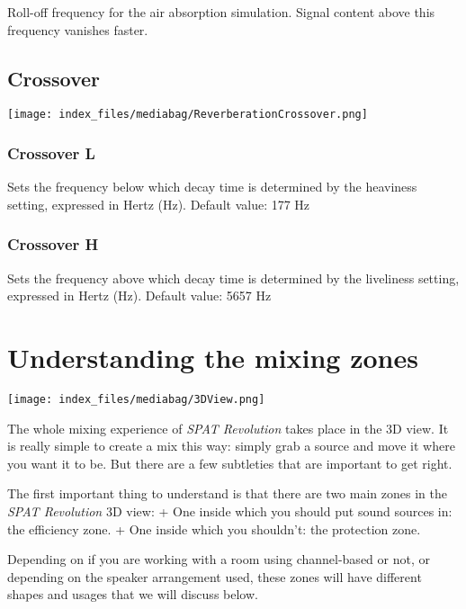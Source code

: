 \documentclass[
  letterpaper,
  DIV=11,
  numbers=noendperiod]{scrreport}
\begin{document}
Roll-off frequency for the air absorption simulation. Signal content
above this frequency vanishes faster.

\hypertarget{crossover}{%
\section{Crossover}\label{crossover}}

\texttt{[image: index\_files/mediabag/ReverberationCrossover.png]}

\hypertarget{crossover-l}{%
\subsection{Crossover L}\label{crossover-l}}

Sets the frequency below which decay time is determined by the heaviness
setting, expressed in Hertz (Hz). Default value: 177 Hz

\hypertarget{crossover-h}{%
\subsection{Crossover H}\label{crossover-h}}

Sets the frequency above which decay time is determined by the
liveliness setting, expressed in Hertz (Hz). Default value: 5657 Hz

\hypertarget{understanding-the-mixing-zones}{%
\chapter{Understanding the mixing
zones}\label{understanding-the-mixing-zones}}

\texttt{[image: index\_files/mediabag/3DView.png]}

The whole mixing experience of \emph{SPAT Revolution} takes place in the
3D view. It is really simple to create a mix this way: simply grab a
source and move it where you want it to be. But there are a few
subtleties that are important to get right.

The first important thing to understand is that there are two main zones
in the \emph{SPAT Revolution} 3D view: + One inside which you should put
sound sources in: the efficiency zone. + One inside which you shouldn't:
the protection zone.

Depending on if you are working with a room using channel-based or not,
or depending on the speaker arrangement used, these zones will have
different shapes and usages that we will discuss below.
\end{document}
